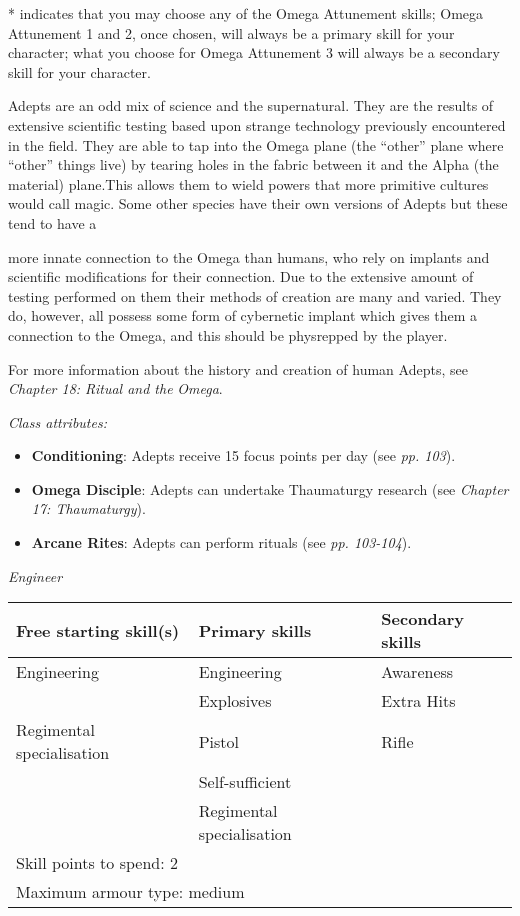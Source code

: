 \documentclass{scrbook}
\begin{document}
* indicates that you may choose any of the Omega Attunement skills; Omega Attunement 1 and 2, once chosen, will always be a primary skill for your character; what you choose for Omega Attunement 3 will always be a secondary skill for your character.

Adepts are an odd mix of science and the supernatural. They are the results of extensive scientific testing based upon strange technology previously encountered in the field. They are able to tap into the Omega plane (the ``other'' plane where ``other'' things live) by tearing holes in the fabric between it and the Alpha (the material) plane.This allows them to wield powers that more primitive cultures would call magic. Some other species have their own versions of Adepts but these tend to have a

more innate connection to the Omega than humans, who rely on implants and scientific modifications for their connection. Due to the extensive amount of testing performed on them their methods of creation are many and varied. They do, however, all possess some form of cybernetic implant which gives them a connection to the Omega, and this should be physrepped by the player.

For more information about the history and creation of human Adepts, see \textit{Chapter 18: Ritual and the} \textit{Omega}.

\textit{Class attributes:}

\begin{itemize}
\item \textbf{Conditioning}: Adepts receive 15 focus points per day (see \textit{pp. 103}).

\item \textbf{Omega Disciple}: Adepts can undertake Thaumaturgy research (see \textit{Chapter 17: Thaumaturgy}).

\item \textbf{Arcane Rites}: Adepts can perform rituals (see \textit{pp. 103-104}).

\end{itemize}
\textit{Engineer}

\begin{table}
\begin{tabular}{|l|l|l|} \hline 
Free starting skill(s) & Primary skills & Secondary skills \\
 \hline Engineering & Engineering & Awareness \\
 \hline  & Explosives & Extra Hits \\
 \hline Regimental specialisation & Pistol & Rifle \\
 \hline  & Self-sufficient &  \\
 \hline  & Regimental specialisation &  \\
 \hline \multicolumn{3}{|l|}{Skill points to spend: 2} \\
 \hline \multicolumn{3}{|l|}{Maximum armour type: medium} \\
 \hline \end{tabular}

\end{table}
\end{document}
